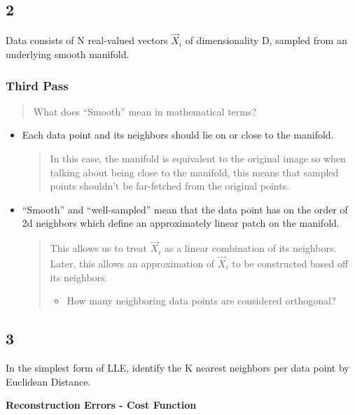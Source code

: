 \documentclass[11pt]{article}
\begin{document}
\subsection{2}
\label{sec:orgfca3f36}
Data consists of N real-valued vectors \(\vec X_i\) of dimensionality D, sampled
from an underlying smooth manifold.

\subsubsection{Third Pass}
\label{sec:orgba123c7}

\begin{quote}
What does ``Smooth'' mean in mathematical terms?
\end{quote}

\begin{itemize}
\item Each data point and its neighbors should lie on or close to the manifold.

\begin{quote}
In this case, the manifold is equivalent to the original image so when talking
about being close to the manifold, this means that sampled points shouldn't be
far-fetched from the original points.
\end{quote}

\item ``Smooth'' and ``well-sampled'' mean that the data point has on the order of 2d
neighbors which define an approximately linear patch on the manifold.

\begin{quote}
This allows us to treat \(\vec X_i\) as a linear combination of its neighbors.
Later, this allows an approximation of \(\vec X_i\) to be constructed based off
its neighbors.

\begin{itemize}
\item How many neighboring data points are considered orthogonal?
\end{itemize}
\end{quote}
\end{itemize}
\subsection{3}
\label{sec:org6115d8c}
In the simplest form of LLE, identify the K nearest neighbors per data point by
Euclidean Distance.

\textbf{Reconstruction Errors - Cost Function}
\end{document}
